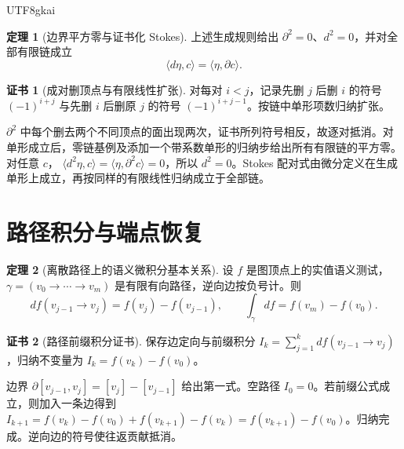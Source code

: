 \documentclass[12pt]{report}
\makeatletter
\theoremstyle{definition}
\newtheorem{theorem}{定理}[chapter]
\newtheorem{Certificate}{证书}[chapter]
\renewenvironment{proof}[1][\proofname]{\par
  \pushQED{\qed}\normalfont
  \topsep6\p@\@plus6\p@\relax
  \trivlist
  \item[\hskip\labelsep\normalfont #1\@addpunct{.}]\ignorespaces
}{
  \popQED\endtrivlist\@endpefalse
}
\makeatother
\begin{document}
\begin{CJK*}{UTF8}{gkai}
\begin{theorem}[边界平方零与证书化 Stokes]
\label{thm:stokes}
上述生成规则给出 \(\partial^2=0\)、\(d^2=0\)，并对全部有限链成立
\[
\langle d\eta,c\rangle=\langle\eta,\partial c\rangle.
\]
\end{theorem}
\begin{Certificate}[成对删顶点与有限线性扩张]
对每对 \(i<j\)，记录先删 \(j\) 后删 \(i\) 的符号 \((-1)^{i+j}\) 与先删 \(i\) 后删原 \(j\) 的符号 \((-1)^{i+j-1}\)。按链中单形项数归纳扩张。
\end{Certificate}
\begin{proof}
\(\partial^2\) 中每个删去两个不同顶点的面出现两次，证书所列符号相反，故逐对抵消。对单形成立后，零链基例及添加一个带系数单形的归纳步给出所有有限链的平方零。对任意 \(c\)，
\(\langle d^2\eta,c\rangle=\langle\eta,\partial^2c\rangle=0\)，所以 \(d^2=0\)。Stokes 配对式由微分定义在生成单形上成立，再按同样的有限线性归纳成立于全部链。
\end{proof}

\section{路径积分与端点恢复}
\begin{theorem}[离散路径上的语义微积分基本关系]
\label{thm:fundamental}
设 \(f\) 是图顶点上的实值语义测试，\(\gamma=(v_0\to\cdots\to v_m)\) 是有限有向路径，逆向边按负号计。则
\[
df(v_{j-1}\to v_j)=f(v_j)-f(v_{j-1}),\qquad
\int_\gamma df=f(v_m)-f(v_0).
\]
\end{theorem}
\begin{Certificate}[路径前缀积分证书]
保存边定向与前缀积分 \(I_k=\sum_{j=1}^kdf(v_{j-1}\to v_j)\)，归纳不变量为 \(I_k=f(v_k)-f(v_0)\)。
\end{Certificate}
\begin{proof}
边界 \(\partial[v_{j-1},v_j]=[v_j]-[v_{j-1}]\) 给出第一式。空路径 \(I_0=0\)。若前缀公式成立，则加入一条边得到
\(I_{k+1}=f(v_k)-f(v_0)+f(v_{k+1})-f(v_k)=f(v_{k+1})-f(v_0)\)。归纳完成。逆向边的符号使往返贡献抵消。
\end{proof}


\end{CJK*}
\end{document}
